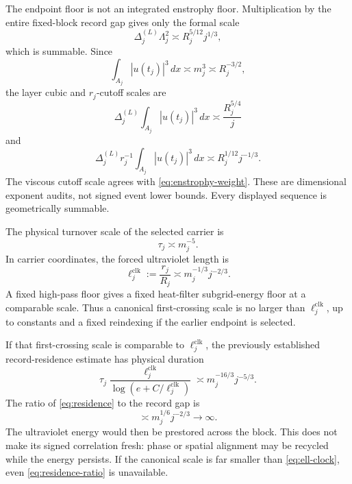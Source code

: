 \documentclass[11pt]{article}
\theoremstyle{remark}
\begin{document}
The endpoint floor is not an integrated enstrophy floor.  Multiplication
by the entire fixed-block record gap gives only the formal scale
\begin{equation}
 \label{eq:enstrophy-weight}
 \Delta_j^{(L)}\Lambda_j^2
 \asymp R_j^{5/12}j^{1/3},
\end{equation}
which is summable.  Since
\[
 \int_{A_j}|u(t_j)|^3\,dx
 \asymp m_j^3
 \asymp R_j^{-3/2},
\]
the layer cubic and \(r_j\)-cutoff scales are
\begin{equation}
 \label{eq:cubic-weight}
 \Delta_j^{(L)}
 \int_{A_j}|u(t_j)|^3\,dx
 \asymp\frac{R_j^{5/4}}j
\end{equation}
and
\begin{equation}
 \label{eq:flux-weight}
 \Delta_j^{(L)}r_j^{-1}
 \int_{A_j}|u(t_j)|^3\,dx
 \asymp R_j^{1/12}j^{-1/3}.
\end{equation}
The viscous cutoff scale agrees with
\eqref{eq:enstrophy-weight}.  These are dimensional exponent audits,
not signed event lower bounds.  Every displayed sequence is
geometrically summable.

The physical turnover scale of the selected carrier is
\[
 \tau_j\asymp m_j^{-5}.
\]
In carrier coordinates, the forced ultraviolet length is
\begin{equation}
 \label{eq:ell-clock}
 \ell_j^{\mathrm{clk}}
 :=\frac{r_j}{R_j}
 \asymp m_j^{-1/3}j^{-2/3}.
\end{equation}
A fixed high-pass floor gives a fixed heat-filter subgrid-energy floor
at a comparable scale.  Thus a canonical first-crossing scale is no
larger than \(\ell_j^{\mathrm{clk}}\), up to constants and a fixed
reindexing if the earlier endpoint is selected.

If that first-crossing scale is comparable to
\(\ell_j^{\mathrm{clk}}\), the previously established record-residence
estimate has physical duration
\begin{equation}
 \label{eq:residence}
 \tau_j
 \frac{\ell_j^{\mathrm{clk}}}
 {\log(e+C/\ell_j^{\mathrm{clk}})}
 \asymp
 m_j^{-16/3}j^{-5/3}.
\end{equation}
The ratio of \eqref{eq:residence} to the record gap is
\begin{equation}
 \label{eq:residence-ratio}
 \asymp m_j^{1/6}j^{-2/3}\longrightarrow\infty.
\end{equation}
The ultraviolet energy would then be prestored across the block.  This
does not make its signed correlation fresh: phase or spatial alignment
may be recycled while the energy persists.  If the canonical scale is
far smaller than \eqref{eq:ell-clock}, even
\eqref{eq:residence-ratio} is unavailable.
\end{document}
